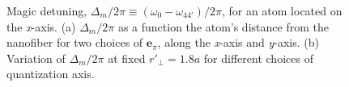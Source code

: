 \documentclass[preprint,aps,pra,onecolumn]{revtex4-1} %
\newcommand{\qaxis}{\mathbf{e}_\pi}
\begin{document}
\begin{figure}
\begin{minipage}{.49\linewidth}
\centering
{}
\end{minipage}
\begin{minipage}{.49\linewidth}
\centering
{}
\end{minipage}
\caption{Magic detuning, $\Delta_m/2\pi \equiv (\omega_{0}-\omega_{44'})/2\pi$, for an atom located on the \emph{x}-axis. (a) $\Delta_m/2\pi$ as a function the atom's distance from the nanofiber for two choices of $\qaxis$, along the \emph{x}-axis and \emph{y}-axis. (b) Variation of $\Delta_m/2\pi$ at fixed $ r'\!_\perp=1.8a$ for different choices of quantization axis. }\label{Fig::CouplingStrength}
\end{figure}
\end{document}
